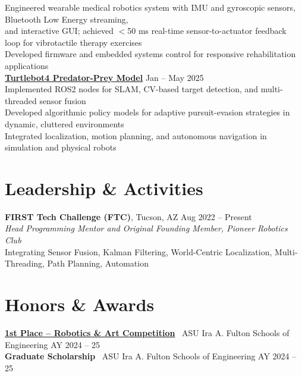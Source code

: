 \documentclass[10pt]{article}
\begin{document}
\hspace*{2em}Engineered wearable medical robotics system with IMU and gyroscopic sensors, Bluetooth Low Energy streaming, \\
\hspace*{2em}and interactive GUI; achieved $<$50 ms real-time sensor-to-actuator feedback loop for vibrotactile therapy exercises \\
\hspace*{2em}Developed firmware and embedded systems control for responsive rehabilitation applications
\\
\textbf{\href{https://ASU-RAS598-2025-S-TEAM02.github.io}{Turtlebot4 Predator-Prey Model}} \hfill Jan -- May 2025 \\
\hspace*{2em}Implemented ROS2 nodes for SLAM, CV-based target detection, and multi-threaded sensor fusion \\
\hspace*{2em}Developed algorithmic policy models for adaptive pursuit-evasion strategies in dynamic, cluttered environments \\
\hspace*{2em}Integrated localization, motion planning, and autonomous navigation in simulation and physical robots

\section*{Leadership \& Activities}
\textbf{FIRST Tech Challenge (FTC)}, Tucson, AZ \hfill Aug 2022 -- Present \\
\textit{Head Programming Mentor and Original Founding Member, Pioneer Robotics Club}\\
\hspace*{2em}Integrating Sensor Fusion, Kalman Filtering, World-Centric Localization, Multi-Threading, Path Planning, Automation

\section*{Honors \& Awards}
\textbf{\href{https://www.linkedin.com/posts/mhgross_asuengineering-design-robotics-activity-7324315472491855873-Gn_C}{1st Place -- Robotics \& Art Competition}} \textbar\ ASU Ira A. Fulton Schools of Engineering \hfill AY 2024 -- 25 \\
\textbf{Graduate Scholarship} \textbar\ ASU Ira A. Fulton Schools of Engineering \hfill AY 2024 -- 25
\end{document}
